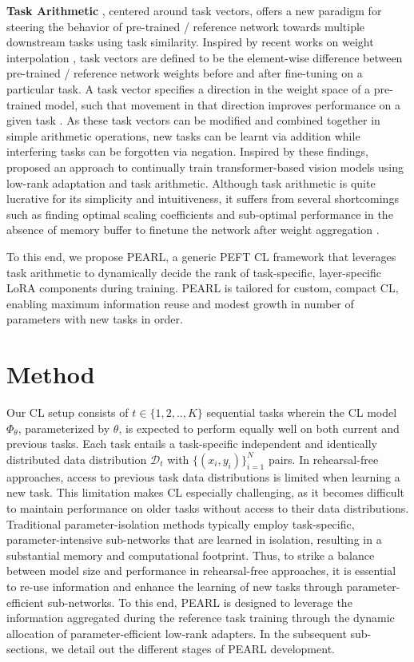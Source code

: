 \documentclass[10pt]{article} %
\begin{document}
\textbf{Task Arithmetic} \citep{ilharcoediting}, centered around task vectors, offers a new paradigm for steering the behavior of pre-trained / reference network towards multiple downstream tasks using task similarity. Inspired by recent works on weight interpolation \citep{frankle2020linear, ilharco2022patching, ainsworth2022git}, task vectors are defined to be the element-wise difference between pre-trained / reference network weights before and after fine-tuning on a particular task. A task vector specifies a direction in the weight space of a pre-trained model, such that movement in that direction improves performance on a given task \citep{ilharcoediting}. As these task vectors can be modified and combined together in simple arithmetic operations, new tasks can be learnt via addition while interfering tasks can be forgotten via negation. Inspired by these findings, \citet{chitale2023task} proposed an approach to continually train transformer-based vision models using low-rank adaptation and task arithmetic. Although task arithmetic is quite lucrative for its simplicity and intuitiveness, it suffers from several shortcomings such as finding optimal scaling coefficients and sub-optimal performance in the absence of memory buffer to finetune the network after weight aggregation \citep{zhou2024metagpt}. 

To this end, we propose PEARL, a generic PEFT CL framework that leverages task arithmetic to dynamically decide the rank of task-specific, layer-specific LoRA components during training. PEARL is tailored for custom, compact CL, enabling maximum information reuse and modest growth in number of parameters with new tasks in order. 

\section{Method}

Our CL setup consists of $t \in \{ 1, 2,..,K\}$  sequential tasks wherein the CL model $\Phi_\theta$, parameterized by $\theta$, is expected to perform equally well on both current and previous tasks. Each task entails a task-specific independent and identically distributed data distribution $\mathcal{D}_t$ with $\{(x_i, y_i)\}_{i=1}^{N}$ pairs. In rehearsal-free approaches, access to previous task data distributions is limited when learning a new task. This limitation makes CL especially challenging, as it becomes difficult to maintain performance on older tasks without access to their data distributions. Traditional parameter-isolation methods typically employ task-specific, parameter-intensive sub-networks that are learned in isolation, resulting in a substantial memory and computational footprint. Thus, to strike a balance between model size and performance in rehearsal-free approaches, it is essential to re-use information and enhance the learning of new tasks through parameter-efficient sub-networks. To this end, PEARL is designed to leverage the information aggregated during the reference task training through the dynamic allocation of parameter-efficient low-rank adapters. In the subsequent sub-sections, we detail out the different stages of PEARL development.
\end{document}

